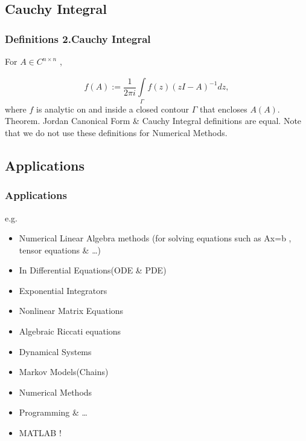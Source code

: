 

\subsection{Cauchy Integral}

\begin{frame}

    \frametitle{Definitions \newline 2.Cauchy Integral}
For $A \in C ^ {n \times n} $ ,

\[
f(A):= \frac{1}{2 \pi i}\int\limits_{\Gamma}^{} f(z)(zI -A)^{-1}dz,
\]
where $f$ is analytic on and inside a closed contour $\Gamma$ that encloses $A(A)$.\newline  \newline
Theorem. Jordan Canonical Form \& Cauchy Integral definitions are equal.\newline
\newline
Note that we do not use these definitions for Numerical Methods.
\end{frame}



\subsection{Applications}


\begin{frame}
\frametitle{Applications}
e.g.
\begin{itemize}
\item Numerical Linear Algebra methods (for solving equations such as Ax=b , tensor equations \& \dots)
\item In Differential Equations(ODE \& PDE)
\item Exponential Integrators
\item Nonlinear Matrix Equations
\item Algebraic Riccati equations
\item Dynamical Systems
\item Markov Models(Chains)
\item Numerical Methods
\item Programming \& \dots 
\item MATLAB !
\end{itemize}
\end{frame}





